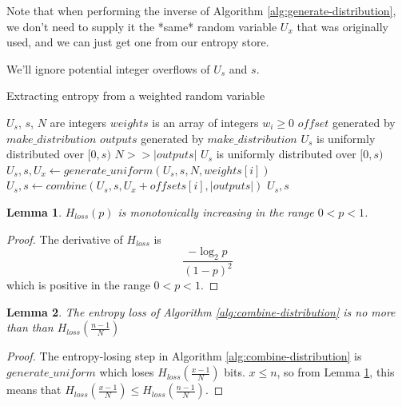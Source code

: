 \documentclass[12pt]{article}
\newtheorem{lemma}{Lemma}
\begin{document}
Note that when performing the inverse of Algorithm \ref{alg:generate-distribution}, we don't need to supply it the *same* random variable $U_x$ that was originally used, and we can just get one from our entropy store.

We'll ignore potential integer overflows of $U_s$ and $s$.

\begin{algorithm}
\caption{Extracting entropy from a weighted random variable}
\label{alg:combine-distribution}
\begin{algorithmic}[1]
\Require $U_s$, $s$, $N$ are integers
\Require $weights$ is an array of integers $w_i \ge 0$
\Require $offset$ generated by $make\_distribution$ 
\Require $outputs$ generated by $make\_distribution$
\Require $U_s$ is uniformly distributed over $[0,s)$
\Require $N >> |outputs|$
\Ensure $U_s$ is uniformly distributed over $[0,s)$
    \State $U_s, s, U_x \gets generate\_uniform(U_s, s, N, weights[i])$
    \State $U_s, s \gets combine(U_s, s, U_x + offsets[i], |outputs|)$
    \State \Return $U_s, s$
\EndProcedure
\end{algorithmic}
\end{algorithm}



\begin{lemma}
    \label{lem:hloss_monotonic}
    $H_{loss}(p)$ is monotonically increasing in the range $0 < p < 1$.
\end{lemma}

\begin{proof}The derivative of $H_{loss}$ is
    \begin{equation}
        \frac{-\log_2p}{(1-p)^2}
    \end{equation}
    which is positive in the range $0 < p < 1$.
\end{proof}

\begin{lemma}
The entropy loss of Algorithm \ref{alg:combine-distribution} is no more than than $H_{loss}(\frac{n-1}{N})$
\end{lemma}

\begin{proof}
    The entropy-losing step in Algorithm \ref{alg:combine-distribution} is $generate\_uniform$ which loses $H_{loss}(\frac{x-1}{N})$ bits. $x \le n$, so from Lemma \ref{lem:hloss_monotonic}, this means that $H_{loss}(\frac{x-1}{N}) \le H_{loss}(\frac{n-1}{N})$.
\end{proof}
\end{document}
